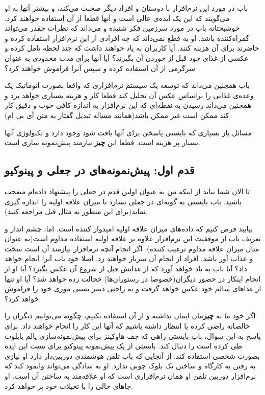 باب در مورد این نرم‌افزار با دوستان و افراد دیگر صحبت می‌کند، و بیشتر
آنها به او می‌گویند که این یک ایده‌ی عالی است و آنها قطعا از آن استفاده
خواهند کرد. خوشبختانه باب در مورد سرزمین فکر شنیده و می‌داند که نظرات
چقدر می‌تواند گمراه‌کننده باشد. او به قطع نمی‌داند که چه افرادی از این
نرم‌افزار استفاده کرده و حاضرند برای آن هزینه کنند. آیا کاربران به یاد
خواهند داشت که چند لحظه تامل کرده و عکسی از غذای خود قبل از خوردن آن
بگیرند؟ آیا آنها برای مدت محدودی به عنوان سرگرمی از آن استفاده کرده و
سپس آنرا فراموش خواهند کرد؟

باب همچنین می‌داند که توسعه یک سیستم نرم‌افزاری که واقعا بصورت اتوماتیک
یک وعده‌ی غذایی را براساس عکس آن تحلیل کند قطعا کار و هزینه بسیاری خواهد
برد و همچنین می‌داند رسیدن به نقطه‌ای که این نرم‌افزار به اندازه کافی
خوب و دقیق کار کند ممکن است غیر ممکن باشد(همانند مساله تبدیل گفتار به
متن آی بی ام)

مسائل باز بسیاری که بایستی پاسخی برای آنها یافت شود وجود دارد و تکنولوژی
آنها بسیار پر هزینه است. قطعا این \textbf{چیز} نیازمند پیش‌نمونه سازی
است.

\subsection{قدم اول: پیش‌نمونه‌های در جعلی و
پینوکیو}\label{ux642ux62fux645-ux627ux648ux644-ux67eux6ccux634ux646ux645ux648ux646ux647ux647ux627ux6cc-ux62fux631-ux62cux639ux644ux6cc-ux648-ux67eux6ccux646ux648ux6a9ux6ccux648}

تا الان شما نباید از اینکه من به عنوان اولین قدم در جعلی را پیشنهاد
داده‌ام متعجب باشید. باب بایستی به گونه‌ای در جعلی بسازد تا میزان علاقه
اولیه را اندازه گیری نماید(برای این منظور به مثال قبل مراجعه کنید).

بیایید فرض کنیم که داده‌های میزان علاقه اولیه امیدوار کننده است. اما،
چشم انداز و تعریف باب از موفقیت این نرم‌افزار علاوه بر علاقه اولیه
استفاده مداوم است(به عنوان مثال میزان علاقه مداوم ترغیب کننده). اگر
انجام آنچه نرم‌افزار نیازمند آن است سخت و عذاب آور باشد، افراد از انجام
آن سرباز خواهند زد. اصلا خود باب آنرا انجام خواهد داد؟ آیا باب به یاد
خواهد آورد که از غذایش قبل از شروع آن عکس بگیرد؟ آیا او از انجام اینکار
در حضور دیگران(خصوصا در رستوران‌ها) خجالت زده خواهد شد؟ آیا او تنها از
غذاهای سالم خود عکس خواهد گرفت و به راحتی دسر بستی موزی خود را فراموش
خواهد کرد؟

اگر خود ما به \textbf{چیز}مان ایمان نداشته و از آن استفاده نکنیم، چگونه
می‌توانیم دیگران را خالصانه راضی کرده یا انتظار داشته باشیم که آنها این
کار را انجام خواهند داد. برای پاسخ به این سوال، باب بایستی راهی که جف
هاوکینز برای پیش‌نمونه‌سازی پالم پایلوت طی کرده است را دنبال کند. بایستی
از یک پیش‌نمونه پینوکیو برای تست این ایده بصورت شخصی استفاده کند. از
آنجایی که باب تلفن هوشمندی دوربین‌دار دارد او نیازی به رفتن به کارگاه و
ساختن یک بلوک چوبی ندارد. او به سادگی می‌تواند وانمود کند که نرم‌افزار
دوربین تلفن او همان نرم‌افزاری است که او علاقه‌مند به ساختن آن است. او
جاهای خالی را با تخیلات خود پر خواهد کرد.

